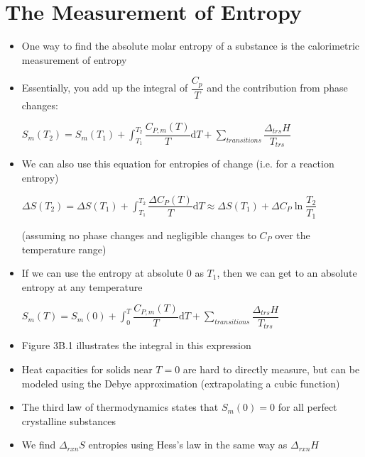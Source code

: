 \documentclass[12pt, openany, letterpaper]{memoir}
\begin{document}
\section{The Measurement of Entropy}
\begin{itemize}
	\item One way to find the absolute molar entropy of a substance is the calorimetric measurement of entropy
	\item Essentially, you add up the integral of $\dfrac{C_p}{T}$ and the contribution from phase changes:

    $S_m(T_2) = S_m(T_1) + \displaystyle\int_{T_1}^{T_2}\dfrac{C_{P,m}(T)}{T}\mathrm{d}T + \displaystyle\sum\limits_{transitions}\dfrac{\Delta_{trs}H}{T_{trs}}$
  \item We can also use this equation for entropies of change (i.e. for a reaction entropy)

    $\Delta S(T_2) = \Delta S(T_1) + \displaystyle\int_{T_1}^{T_2}\dfrac{\Delta C_{P}(T)}{T}\mathrm{d}T \approx \Delta S(T_1) + \Delta C_{P}\ln\dfrac{T_2}{T_1}$ 

    (assuming no phase changes and negligible changes to $C_P$ over the temperature range)
  \item If we can use the entropy at absolute $0$ as $T_1$, then we can get to an absolute entropy at any temperature

	      $S_m(T) = S_m(0) + \displaystyle\int_0^T\dfrac{C_{P,m}(T)}{T}\mathrm{d}T + \displaystyle\sum\limits_{transitions}\dfrac{\Delta_{trs}H}{T_{trs}}$
	\item Figure 3B.1 illustrates the integral in this expression
	\item Heat capacities for solids near $T=0$ are hard to directly measure, but can be modeled using the Debye approximation (extrapolating a cubic function)
	\item The third law of thermodynamics states that $S_m(0) = 0$ for all perfect crystalline substances
	\item We find $\Delta_{rxn}S$ entropies using Hess's law in the same way as $\Delta_{rxn} H$
\end{itemize}
\end{document}

